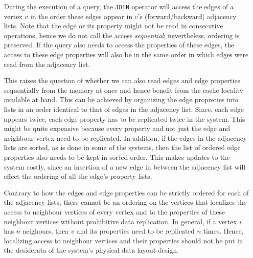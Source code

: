 \label{ssec:edges-ordered}
\begin{guideline}
	
During the execution of a query, the \texttt{JOIN} operator will access the edges of a vertex $v$ in the order these edges appear in $v$'s (forward/backward) adjacency lists. Note that the edge or its property might not be read in consecutive operations, hence we do not call the access \emph{sequential}; nevertheless, ordering is preserved. If the query also needs to access the properties of these edges, the access to these edge properties will also be in the same order in which edges were read from the adjacency list. 

This raises the question of whether we can also read edges and edge properties sequentially from the memory at once and hence benefit from the cache locality available at hand. This can be achieved by organizing the edge propreties into lists in an order identical to that of edges in the adjacency list. Since, each edge appears twice, each edge property has to be replicated twice in the system. This might be quite expensive because every property and not just the edge and neighbour vertex need to be replicated. In addition, if the edges in the adjacency lists are sorted, as is done in some of the systems, then the list of ordered edge properties also needs to be kept in sorted order. This makes updates to the system costly, since an insertion of a new edge in between the adjacency list will effect the ordering of all the edge's property lists.

\end{guideline}

\begin{guideline}
\label{gdln:vertices-unordered}

Contrary to how the edges and edge properties can be strictly ordered for each of the adjacency lists, there cannot be an ordering on the vertices that localizes the access to neighbour vertices of every vertex and to the properties of these neighbour vertices without prohibitive data replication. In general, if a vertex $v$ has $n$ neighours, then $v$ and its properties need to be replicated $n$ times. Hence, localizing access to neighbour vertices and their properties should not be put in the desiderata of the system's physical data layout design.

\end{guideline}

